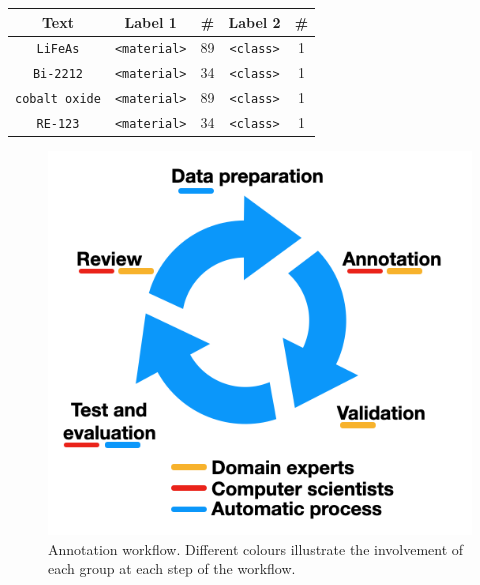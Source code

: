 \documentclass[]{interact}
\theoremstyle{plain}%
\theoremstyle{definition}
\theoremstyle{remark}
\begin{document}
\begin{table}[ht]
    {\begin{tabular}{ ccccc } 
    \toprule
        Text & Label 1 & \# & Label 2 & \#\\
    \midrule
        \texttt{LiFeAs}         &   \texttt{<material>}   &    89   &   \texttt{<class>}  &   1   \\
        \texttt{Bi-2212}        &	\texttt{<material>}   &    34   &   \texttt{<class>}  &   1   \\
        \texttt{cobalt oxide}   &   \texttt{<material>}   &    89   &   \texttt{<class>}  &   1   \\
        \texttt{RE-123}         &	\texttt{<material>}   &    34   &   \texttt{<class>}  &   1   \\
    \bottomrule
    \end{tabular}}
    \label{table:dataset-inconsistencies-clear}
\end{table}


\begin{figure}[htb]
\centering
  \centering
  \includegraphics[width=0.5\linewidth]{workflow-schema}
  \caption{Annotation workflow. Different colours illustrate the involvement of each group at each step of the workflow.}
  \label{fig:schema-comparison-modified-workflow}
\end{figure}
\end{document}
